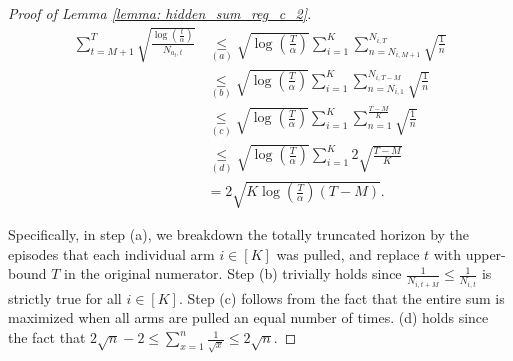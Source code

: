 \begin{proof}[Proof of Lemma \ref{lemma: hidden_sum_reg_c_2}]
\begin{equation}
\label{eq: trunc_regret_r}
\begin{aligned}
 \sum_{t=M+1}^{T} \sqrt{\frac{ \log \left( \frac{t}{\alpha} \right)}{N_{a_t,t}}}
& \underset{(a)}{\leq }
\sqrt{ \log \left( \frac{T}{\alpha} \right)} \sum_{i=1}^{K} \sum_{n=N_{i,M+1}}^{N_{i,T}} \sqrt{\frac{1}{n}}\\
& \underset{(b)}{\leq }
\sqrt{ \log \left( \frac{T}{\alpha} \right)} \sum_{i=1}^{K} \sum_{n=N_{i,1}}^{N_{i,T-M}} \sqrt{\frac{1}{n}}\\
& \underset{(c)}{\leq }
\sqrt{ \log \left( \frac{T}{\alpha} \right)} \sum_{i=1}^{K} \sum_{n=1}^{\frac{T-M}{K}} \sqrt{\frac{1}{n}}\\
& \underset{(d)}{\leq }
\sqrt{ \log \left( \frac{T}{\alpha} \right)} \sum_{i=1}^{K} 2 \sqrt{\frac{T-M}{K}}\\
& =
2 \sqrt{ K \log \left( \frac{T}{\alpha} \right) (T-M)}.
\end{aligned}
\end{equation}

Specifically, in step (a), we breakdown the totally truncated horizon by the episodes that each individual arm $i \in [K]$ was pulled, and replace $t$ with upper-bound $T$ in the original numerator.
Step (b) trivially holds since $\frac{1}{N_{i,t+M}} \leq \frac{1}{N_{i,t}}$ is strictly true for all $i \in [K]$. Step (c) follows from the fact that the entire sum is maximized when all arms are pulled an equal number of times. (d) holds since the fact that $ 2\sqrt{n}-2 \leq \sum_{x=1}^{n} \frac{1}{\sqrt{x}} \leq 2\sqrt{n} $.
\end{proof}
















